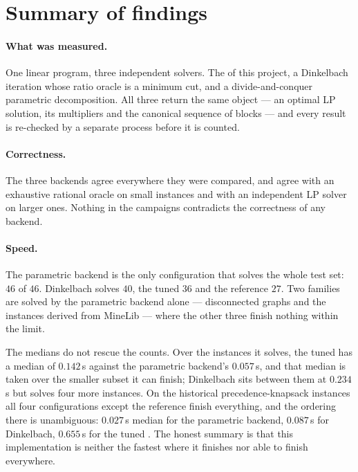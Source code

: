 \section*{Summary of findings}

\paragraph{What was measured.} One linear program, three independent solvers.
The \FS{} of this project, a Dinkelbach iteration whose ratio oracle is a
minimum cut, and a divide-and-conquer parametric decomposition. All three return
the same object --- an optimal LP solution, its multipliers and the canonical
sequence of blocks --- and every result is re-checked by a separate process
before it is counted.

\paragraph{Correctness.} The three backends agree everywhere they were compared,
and agree with an exhaustive rational oracle on small instances and with an
independent LP solver on larger ones. Nothing in the campaigns contradicts the
correctness of any backend.


\paragraph{Speed.} The parametric backend is the only configuration that solves
the whole test set: $46$ of $46$. Dinkelbach solves $40$, the tuned \FS{} $36$
and the reference \FS{} $27$. Two families are solved by the parametric backend
alone --- disconnected graphs and the instances derived from MineLib --- where
the other three finish nothing within the limit.

The medians do not rescue the counts. Over the instances it solves, the tuned
\FS{} has a median of $0.142$\,s against the parametric backend's $0.057$\,s,
and that median is taken over the smaller subset it can finish; Dinkelbach sits
between them at $0.234$\,s but solves four more instances. On the historical
precedence-knapsack instances all four configurations except the reference
finish everything, and the ordering there is unambiguous: $0.027$\,s median for
the parametric backend, $0.087$\,s for Dinkelbach, $0.655$\,s for the tuned
\FS{}. The honest summary is that this implementation is neither the fastest
where it finishes nor able to finish everywhere.

